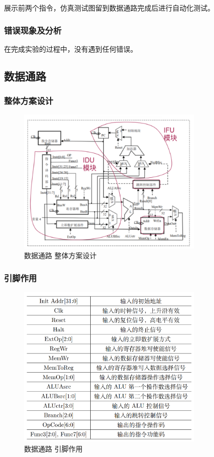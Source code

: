 \documentclass{article}
\begin{document}
    展示前两个指令，仿真测试图留到数据通路完成后进行自动化测试。

    \subsubsection{错误现象及分析}
    在完成实验的过程中，没有遇到任何错误。

    \subsection{数据通路}
    \subsubsection{整体方案设计}
    \begin{figure}[H]
    \centering
    \includegraphics[width=0.8\textwidth]{7.1.png}
    \caption{数据通路 整体方案设计}
    \end{figure}

    \subsubsection{引脚作用}
    \begin{figure}[H]
        \centering
        \includegraphics[width=0.8\textwidth]{7.2.png}
        \caption{数据通路 引脚作用}
    \end{figure}
\end{document}
